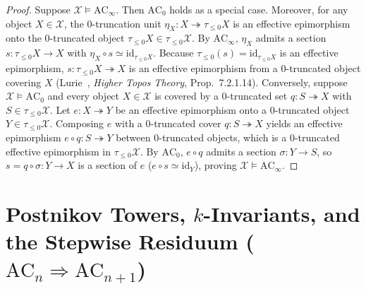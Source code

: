 \begin{proof}
Suppose $\mathcal{X} \models \mathrm{AC}_\infty$. Then $\mathrm{AC}_0$ holds as a special case. Moreover, for any object $X \in \mathcal{X}$, the $0$-truncation unit $\eta_X: X \twoheadrightarrow \tau_{\le 0}X$ is an effective epimorphism onto the $0$-truncated object $\tau_{\le 0}X \in \tau_{\le 0}\mathcal{X}$. By $\mathrm{AC}_\infty$, $\eta_X$ admits a section $s: \tau_{\le 0}X \to X$ with $\eta_X \circ s \simeq \mathrm{id}_{\tau_{\le 0}X}$. Because $\tau_{\le 0}(s) = \mathrm{id}_{\tau_{\le 0}X}$ is an effective epimorphism, $s: \tau_{\le 0}X \twoheadrightarrow X$ is an effective epimorphism from a $0$-truncated object covering $X$ (Lurie~\cite{Lurie09}, \emph{Higher Topos Theory}, Prop.~7.2.1.14). Conversely, suppose $\mathcal{X} \models \mathrm{AC}_0$ and every object $X \in \mathcal{X}$ is covered by a $0$-truncated set $q: S \twoheadrightarrow X$ with $S \in \tau_{\le 0}\mathcal{X}$. Let $e: X \twoheadrightarrow Y$ be an effective epimorphism onto a $0$-truncated object $Y \in \tau_{\le 0}\mathcal{X}$. Composing $e$ with a $0$-truncated cover $q: S \twoheadrightarrow X$ yields an effective epimorphism $e \circ q: S \twoheadrightarrow Y$ between $0$-truncated objects, which is a $0$-truncated effective epimorphism in $\tau_{\le 0}\mathcal{X}$. By $\mathrm{AC}_0$, $e \circ q$ admits a section $\sigma: Y \to S$, so $s = q \circ \sigma: Y \to X$ is a section of $e$ ($e \circ s \simeq \mathrm{id}_Y$), proving $\mathcal{X} \models \mathrm{AC}_\infty$.
\end{proof}

\section{Postnikov Towers, $k$-Invariants, and the Stepwise Residuum ($\mathrm{AC}_n \Rightarrow \mathrm{AC}_{n+1}$)}\label{sec:postnikov-residuum}


